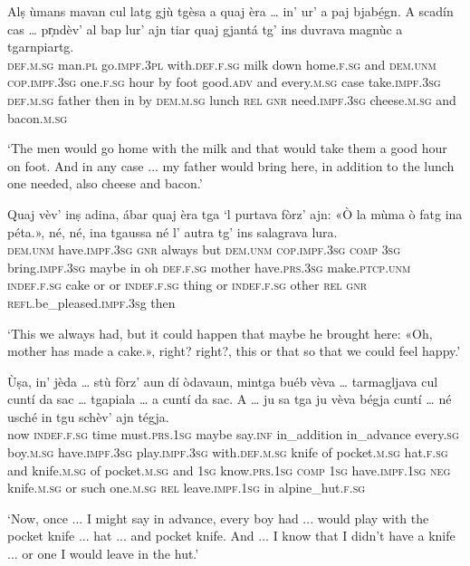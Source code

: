 \begin{linenumbers}
	\gll Alṣ ùmans mavan cul latg gjù tgèsa a quaj èra … in' ur’ a paj bjabé̱gn. A scadín cas … pr̩ndèv’ al bap lur’ ajn tiar quaj gjantá tg’ ins duvrava magnùc a tgarnpiartg.   \\
	\textsc{def.m.sg} man.\textsc{pl} go.\textsc{impf.3pl} with.\textsc{def.f.sg} milk down home.\textsc{f.sg} and \textsc{dem.unm} \textsc{cop.impf.3sg} {} one.\textsc{f.sg} hour by foot good.\textsc{adv} and every.\textsc{m.sg} case {} take.\textsc{impf.3sg} \textsc{def.m.sg} father then in by \textsc{dem.m.sg} lunch \textsc{rel} \textsc{gnr} need.\textsc{impf.3sg} cheese.\textsc{m.sg} and bacon.\textsc{m.sg} \\
\end{linenumbers}
\medskip
\glt `The men would go home with the milk and that would take them a good hour on foot. And in any case ... my father would bring here, in addition to the lunch one needed, also cheese and bacon.'
\medskip

\begin{linenumbers}
\gll Quaj vèv’ inṣ adina, ábar quaj èra tga `l purtava fòrz’ ajn: «Ò la mùma ò fatg ina péta.», né, né, ina tgaussa né l’ autra tg’ ins salagrava lura.\\
\textsc{dem.unm} have.\textsc{impf.3sg} \textsc{gnr} always but \textsc{dem.unm} \textsc{cop.impf.3sg} \textsc{comp} \textsc{3sg} bring.\textsc{impf.3sg} maybe in oh \textsc{def.f.sg} mother have.\textsc{prs.3sg} make.\textsc{ptcp.unm} \textsc{indef.f.sg} cake or or \textsc{indef.f.sg} thing or \textsc{indef.f.sg} other \textsc{rel} \textsc{gnr} \textsc{refl}.be\_pleased.\textsc{impf.3s}g then\\
\end{linenumbers}
\medskip
\glt `This we always had, but it could happen that maybe he brought here: «Oh, mother has made a cake.», right? right?, this or that so that we could feel happy.'
\medskip

\begin{linenumbers}
	\gll  Ùṣa, in' jèda … stù fòrz’ aun dí òdavaun, mintga buéb vèva … tarmagljava cul cuntí da sac … tgapiala … a cuntí da sac. A … ju sa tga ju vèva bégja cuntí … né usché in tgu schèv’ ajn tégja.\\
	now \textsc{indef.f.sg} time {} must.\textsc{prs.1sg} maybe say.\textsc{inf} in\_addition in\_advance every.\textsc{sg} boy.\textsc{m.sg} have.\textsc{impf.3sg} {} play.\textsc{impf.3sg} with.\textsc{def.m.sg} knife of pocket\textsc{.m.sg} {} hat.\textsc{f.sg} {} and knife.\textsc{m.sg} of pocket.\textsc{m.sg} and {} \textsc{1sg} know.\textsc{prs.1sg} \textsc{comp} \textsc{1sg} have.\textsc{impf.1sg} \textsc{neg} knife.\textsc{m.sg} {} or such one.\textsc{m.sg} \textsc{rel} leave.\textsc{impf.1sg} in alpine\_hut.\textsc{f.sg}  \\
\end{linenumbers}
\medskip
\glt `Now, once ... I might say in advance, every boy had ... would play with the pocket knife ... hat ... and pocket knife. And ... I know that I didn't have a knife ... or one I would leave in the hut.'
\medskip


